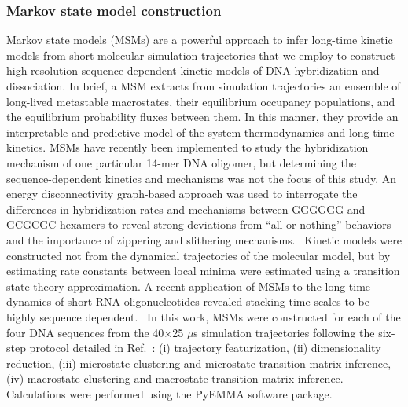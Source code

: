 \documentclass[journal=jpcbfk,manuscript=article]{achemso}
\begin{document}
\subsubsection{Markov state model construction}

Markov state models (MSMs) are a powerful approach to infer long-time kinetic models from short molecular simulation trajectories \citep{Sengupta2019AutomatedSelf-assembly, Pande2010EverythingAsk, Chodera2014MarkovDynamics, Husic2018MarkovScience, Wehmeyer2019IntroductionSoftware} that we employ to construct high-resolution sequence-dependent kinetic models of DNA hybridization and dissociation. In brief, a MSM extracts from simulation trajectories an ensemble of long-lived metastable macrostates, their equilibrium occupancy populations, and the equilibrium probability fluxes between them. In this manner, they provide an interpretable and predictive model of the system thermodynamics and long-time kinetics. MSMs have recently been implemented to study the hybridization mechanism of one particular 14-mer DNA oligomer, but determining the sequence-dependent kinetics and mechanisms was not the focus of this study.\citep{Jin2019} An energy disconnectivity graph-based approach was used to interrogate the differences in hybridization rates and mechanisms between GGGGGG and GCGCGC hexamers to reveal strong deviations from ``all-or-nothing'' behaviors and the importance of zippering and slithering mechanisms.~\citep{Xiao2019} Kinetic models were constructed not from the dynamical trajectories of the molecular model, but by estimating rate constants between local minima were estimated using a transition state theory approximation. A recent application of MSMs to the long-time dynamics of short RNA oligonucleotides revealed stacking time scales to be highly sequence dependent.~\citep{Pinamonti2017} In this work, MSMs were constructed for each of the four DNA sequences from the 40$\times$25 $\mu$s simulation trajectories following the six-step protocol detailed in Ref.~\citep{Sidky2019High-ResolutionVAMPnets}: (i) trajectory featurization, (ii) dimensionality reduction, (iii) microstate clustering and microstate transition matrix inference, (iv) macrostate clustering and macrostate transition matrix inference. Calculations were performed using the PyEMMA software package. \citep{Scherer2015PyEMMAModels}
\end{document}
